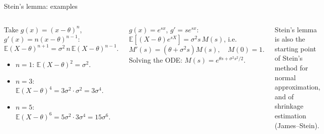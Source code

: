 \documentclass[aspectratio=169,t,10pt]{beamer}
\newcommand{\E}{\mathbb{E}}
\begin{document}
\begin{frame}{Stein's lemma: examples}
  \begin{columns}[T]
  \begin{tcolorbox}[myex={Higher moments of $N(\theta,\sigma^2)$}]\small
  Take $g(x)=(x-\theta)^n$, $g'(x)=n(x-\theta)^{n-1}$:
  \[\E(X-\theta)^{n+1}=\sigma^2\,n\,\E(X-\theta)^{n-1}.\]
  \begin{itemize}
    \item $n=1$: $\E(X-\theta)^2=\sigma^2$.
    \item $n=3$: $\E(X-\theta)^4=3\sigma^2\cdot\sigma^2=3\sigma^4$.
    \item $n=5$: $\E(X-\theta)^6=5\sigma^2\cdot3\sigma^4=15\sigma^6$.
  \end{itemize}
  \end{tcolorbox}
  \begin{tcolorbox}[myex={The normal mgf, again}]\small
  $g(x)=e^{sx}$, $g'=se^{sx}$:
  $\E[(X-\theta)e^{sX}]=\sigma^2s\,M(s)$, i.e.
  \[M'(s)=(\theta+\sigma^2s)M(s),\quad M(0)=1.\]
  Solving the ODE: $M(s)=e^{\theta s+\sigma^2s^2/2}$.
  \end{tcolorbox}
  \begin{tcolorbox}[mynote={Remark}]\scriptsize
  Stein's lemma is also the starting point of Stein's method for normal approximation, and of shrinkage estimation (James--Stein).
  \end{tcolorbox}
  \end{columns}
\end{frame}
\end{document}
